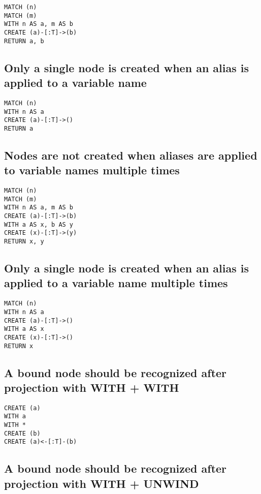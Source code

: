 \begin{lstlisting}
MATCH (n)
MATCH (m)
WITH n AS a, m AS b
CREATE (a)-[:T]->(b)
RETURN a, b
\end{lstlisting}

\subsection{Only a single node is created when an alias is applied to a variable name}

\begin{lstlisting}
MATCH (n)
WITH n AS a
CREATE (a)-[:T]->()
RETURN a
\end{lstlisting}

\subsection{Nodes are not created when aliases are applied to variable names multiple times}

\begin{lstlisting}
MATCH (n)
MATCH (m)
WITH n AS a, m AS b
CREATE (a)-[:T]->(b)
WITH a AS x, b AS y
CREATE (x)-[:T]->(y)
RETURN x, y
\end{lstlisting}

\subsection{Only a single node is created when an alias is applied to a variable name multiple times}

\begin{lstlisting}
MATCH (n)
WITH n AS a
CREATE (a)-[:T]->()
WITH a AS x
CREATE (x)-[:T]->()
RETURN x
\end{lstlisting}

\subsection{A bound node should be recognized after projection with WITH + WITH}

\begin{lstlisting}
CREATE (a)
WITH a
WITH *
CREATE (b)
CREATE (a)<-[:T]-(b)
\end{lstlisting}

\subsection{A bound node should be recognized after projection with WITH + UNWIND}


